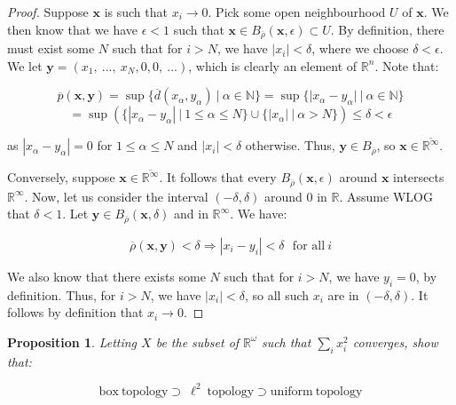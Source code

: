 \documentclass[10pt, oneside]{amsart}
\newtheorem{prop}{Proposition}
\newcommand{\bm}{\boldsymbol}
\begin{document}
    \begin{proof}
      Suppose $\bm{x}$ is such that $x_i \rightarrow 0$. Pick some open neighbourhood $U$ of $\bm{x}$. We then know that we have $\epsilon < 1$ such that $\bm{x} \in B_{\overline{\rho}}(\bm{x}, \epsilon) \subset U$. By definition, there must exist some $N$ such that
      for $i > N$, we have $|x_i| < \delta$, where we choose $\delta < \epsilon$. We let $\bm{y} = (x_1, \ ..., \ x_N, 0, 0, \ ...)$, which is clearly an element of $\mathbb{R}^{n}$. Note that:

      $$\overline{p}(\bm{x}, \bm{y}) = \sup \{ \overline{d}(x_\alpha, y_\alpha) \ | \ \alpha \in \mathbb{N} \} = \sup \{ |x_\alpha - y_\alpha| \ | \ \alpha \in \mathbb{N} \}$$
      $$= \sup \left( \{|x_\alpha - y_\alpha| \ | \ 1 \leq \alpha \leq N\} \cup \{ |x_\alpha| \ | \ \alpha > N \} \right) \leq \delta < \epsilon$$

      as $|x_{\alpha} - y_{\alpha} | = 0$ for $1 \leq \alpha \leq N$ and $|x_i| < \delta$ otherwise. Thus, $\bm{y} \in B_{\overline{\rho}}$, so $\bm{x} \in \overline{\mathbb{R}^{\infty}}$.
      \newline

      Conversely, suppose $\bm{x} \in \overline{\mathbb{R}^{\infty}}$. It follows that every $B_{\overline{\rho}}(\bm{x}, \epsilon)$ around $\bm{x}$ intersects $\mathbb{R}^{\infty}$. Now, let us consider the interval $(-\delta, \delta)$ around
      $0$ in $\mathbb{R}$. Assume WLOG that $\delta < 1$. Let $\bm{y} \in B_{\overline{\rho}}(\bm{x}, \delta)$ and in $\mathbb{R}^{\infty}$. We have:

      $$\overline{\rho}(\bm{x}, \bm{y}) < \delta \Rightarrow |x_i - y_i| < \delta \ \ \ \text{for all} \ i$$

      We also know that there exists
      some $N$ such that for $i > N$, we have $y_i = 0$, by definition. Thus, for $i > N$, we have $|x_i| < \delta$, so all such $x_i$ are in $(-\delta, \delta)$. It follows by definition that $x_i \rightarrow 0$.
    \end{proof}

    \begin{prop}
      Letting $X$ be the subset of $\mathbb{R}^{\omega}$ such that $\sum_{i} x_i^{2}$ converges, show that:

      $$\mathrm{box \ topology} \supset \ \ell^2 \ \mathrm{topology} \supset \mathrm{uniform \ topology}$$
    \end{prop}
\end{document}
